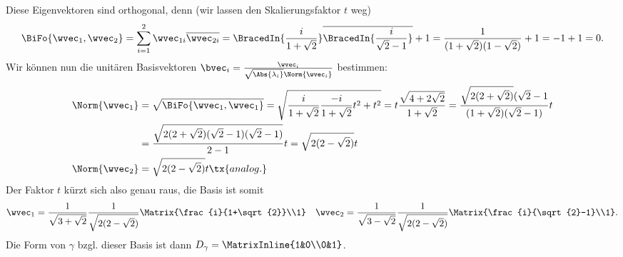 \begin{Beispiel}
\begin{equation*}
\end{equation*}
Diese Eigenvektoren sind orthogonal, denn (wir lassen den Skalierungsfaktor $t$ weg) 
\begin{equation*}
    \BiFo{\wvec_1,\wvec_2}=\sum_{i=1}^2\wvec_{1i}\overline{\wvec_{2i}}=\BracedIn{\frac{i}{1+\sqrt{2}}}\overline{\BracedIn{\frac{i}{\sqrt{2}-1}}}+1=\frac{1}{(1+\sqrt{2})(1-\sqrt{2})}+1=-1+1=0.
\end{equation*}
Wir können nun die unitären Basisvektoren $\bvec_i=\frac{\wvec_i}{\sqrt{\Abs{\lambda_i}}\Norm{\wvec_i}}$ bestimmen:
\begin{align*}
    \Norm{\wvec_1}&=\sqrt{\BiFo{\wvec_1,\wvec_1}}=\sqrt{\frac{i}{1+\sqrt{2}}\frac{-i}{1+\sqrt{2}}t^2+t^2}=t\frac{\sqrt{4+2\sqrt{2}}}{1+\sqrt{2}}=\frac{\sqrt{2(2+\sqrt{2})}(\sqrt{2}-1}{(1+\sqrt{2})(\sqrt{2}-1)}t\\
    &=\frac{\sqrt{2(2+\sqrt{2})(\sqrt{2}-1)(\sqrt{2}-1)}}{2-1}t=\sqrt{2(2-\sqrt{2})}t\\
    \Norm{\wvec_2}&=\sqrt{2(2-\sqrt{2})}t\tx{ analog.}
\end{align*}
Der Faktor $t$ kürzt sich also genau raus, die Basis ist somit
\begin{equation*}
    \wvec_1=\frac{1}{\sqrt{3+\sqrt{2}}}\frac{1}{\sqrt{2(2-\sqrt{2})}}\Matrix{\frac{i}{1+\sqrt{2}}\\1}\quad 
    \wvec_2=\frac{1}{\sqrt{3-\sqrt{2}}}\frac{1}{\sqrt{2(2-\sqrt{2})}}\Matrix{\frac{i}{\sqrt{2}-1}\\1}.
\end{equation*}
Die Form von $\gamma$ bzgl. dieser Basis ist dann $D_\gamma=\MatrixInline{1&0\\0&1}$.
\end{Beispiel}


